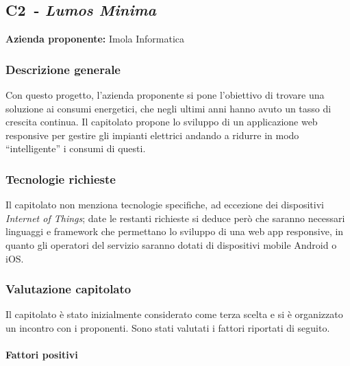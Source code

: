 
\renewcommand{\capName}{\textit{Lumos Minima}} %
\renewcommand{\capCode}{C2} %
\renewcommand{\capLink}{https://www.math.unipd.it/~tullio/IS-1/2022/Progetto/C2.pdf} %
\renewcommand{\capProposer}{ImolaInformatica} %


\subsection{\capCode\ - \capName}
\textbf{Azienda proponente:} Imola Informatica
\subsubsection{Descrizione generale}
Con questo progetto, l'azienda proponente si pone l'obiettivo di trovare una soluzione ai consumi energetici, che negli ultimi anni hanno avuto un tasso di crescita continua. Il capitolato propone lo sviluppo di un applicazione web responsive per gestire gli impianti elettrici andando a ridurre in modo “intelligente” i consumi di questi.
\subsubsection{Tecnologie richieste}
Il capitolato non menziona tecnologie specifiche, ad eccezione dei dispositivi \textit{Internet of Things}; date le restanti richieste si deduce però che saranno necessari linguaggi e framework che permettano lo sviluppo di una web app responsive, in quanto gli operatori del servizio saranno dotati di dispositivi mobile Android o iOS.

\subsubsection{Valutazione capitolato}
Il capitolato è stato inizialmente considerato come terza scelta e si è organizzato un incontro con i proponenti. Sono stati valutati i fattori riportati di seguito.

\paragraph{Fattori positivi}

